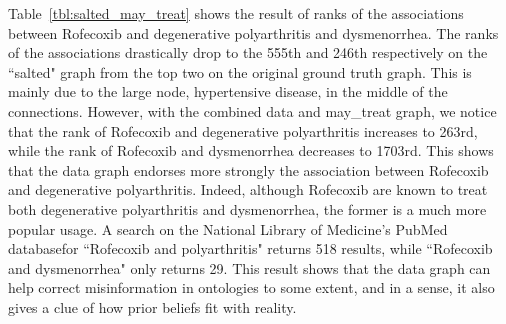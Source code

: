 \documentclass{article}
\begin{document}
Table~\ref{tbl:salted_may_treat} shows the result of ranks of the associations between Rofecoxib and degenerative polyarthritis and dysmenorrhea. The ranks of the associations drastically drop to the 555th and 246th respectively on the ``salted" graph from the top two on the original ground truth graph. This is mainly due to the large node, hypertensive disease, in the middle of the connections. However, with the combined data and may\_treat graph, we notice that the rank of Rofecoxib and degenerative polyarthritis increases to 263rd, while the rank of Rofecoxib and  dysmenorrhea decreases to 1703rd. This shows that the data graph endorses more strongly the association between Rofecoxib and degenerative polyarthritis. Indeed, although Rofecoxib are known to treat both degenerative polyarthritis and dysmenorrhea, the former is a much more popular usage. A search on the National Library of Medicine's PubMed database\footnotemark[1] for ``Rofecoxib and polyarthritis" returns 518 results, while ``Rofecoxib and dysmenorrhea" only returns 29. This result shows that the data graph can help correct misinformation in ontologies to some extent, and in a sense, it also gives a clue of how prior beliefs fit with reality.

\end{document}
